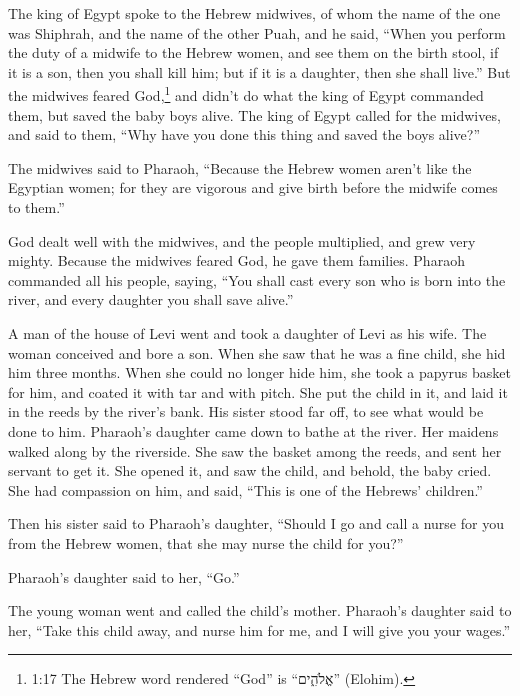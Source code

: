 \myverse{}The king of Egypt spoke to the Hebrew midwives, of whom the name
of the one was Shiphrah, and the name of the other Puah,
\myverse{}and he said, “When you perform the duty of a midwife to the Hebrew women,
and see them on the birth stool, if it is a son, then you shall kill him; but if it is a daughter, then
she shall live.”
\myverse{}But the midwives feared God,\footnote{1:17 The Hebrew word rendered “God” is “אֱלֹהִ֑ים” (Elohim).} and didn’t do what
the king of Egypt commanded them, but saved the baby boys alive.
\myverse{}The king of Egypt called for the midwives, and said to them, “Why have you
done this thing and saved the boys alive?”


\myverse{}The midwives said to Pharaoh, “Because the Hebrew women aren’t
like the Egyptian women; for they are vigorous and give birth before the midwife comes to them.”


\myverse{}God dealt well with the midwives, and the people multiplied,
and grew very mighty.
\myverse{}Because the midwives feared God, he gave them families.
\myverse{}Pharaoh commanded all his people, saying, “You shall cast every son who is born into the river, and every daughter you shall save alive.”


\mychapter{} \myverse*{}A man of the house of Levi went and took a daughter of Levi as his wife. \myverse{}The woman conceived and bore a son. When she saw that he was a fine child, she hid him three months. \myverse{}When she could no longer hide him, she took a papyrus basket for him, and coated
it with tar and with pitch. She put the child in it, and laid it in the reeds by the river’s bank.
\myverse{}His sister stood far off, to see what would be done to him. \myverse{}Pharaoh’s daughter came down to bathe at the river. Her maidens walked along by the riverside. She saw the basket among the reeds, and sent her servant to get it. \myverse{}She opened it, and saw the child, and behold, the baby cried. She had compassion on him, and said, “This is one of the Hebrews’ children.”


\myverse{}Then his sister said to Pharaoh’s daughter, “Should I go and call
a nurse for you from the Hebrew women, that she may nurse the child for you?”


\myverse{}Pharaoh’s daughter said to her, “Go.”

The young woman went and called the child’s mother. \myverse{}Pharaoh’s daughter said to her, “Take this child away, and nurse him for me, and I will give you your wages.”

